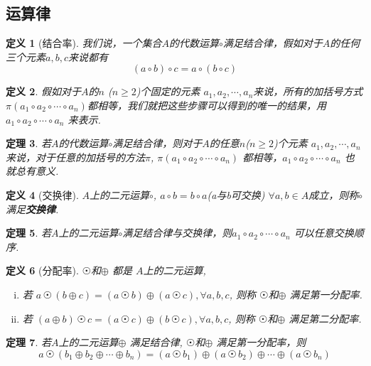 \documentclass[UTF8]{ctexart}
\newtheorem{Definition}{定义}%
\newtheorem{Theorem}[Definition]{定理}
\begin{document}
\subsection{运算律}

\begin{Definition}[结合率]
我们说，一个集合$A$的代数运算$\circ$满足结合律，假如对于$A$的任何三个元素$a, b, c$来说都有$$
(a \circ b) \circ c = a \circ (b \circ c)
$$
\end{Definition}

\begin{Definition}
假如对于$A$的$n$ ($n \ge 2$)个固定的元素 $a_1, a_2, \cdots, a_n$来说，所有的加括号方式 $\pi(a_1 \circ a_2 \circ \cdots \circ a_n)$都相等，我们就把这些步骤可以得到的唯一的结果，用$a_1 \circ a_2 \circ \cdots \circ a_n $ 来表示.
\end{Definition}

\begin{Theorem}
若$A$的代数运算$\circ$满足结合律，则对于$A$的任意$n$($n \ge 2$)个元素 $a_1, a_2, \cdots, a_n$来说，对于任意的加括号的方法$\pi$, $\pi(a_1 \circ a_2 \circ \cdots \circ a_n)$ 都相等，$a_1 \circ a_2 \circ \cdots \circ a_n$ 也就总有意义.
\end{Theorem}

\begin{Definition}[交换律]
$A$上的二元运算$\circ$, $a \circ b = b \circ a$\;(a与b可交换) $\forall a, b \in A$成立，则称$\circ$满足\textbf{交换律}. 
\end{Definition}

\begin{Theorem}
若$A$上的二元运算$\circ$满足结合律与交换律，则$a_1 \circ a_2 \circ \cdots \circ a_n$ 可以任意交换顺序.
\end{Theorem}

\begin{Definition}[分配率]
$ \astrosun $和$ \oplus $ 都是 $A$上的二元运算, 
\begin{enumerate}[i)]
\item 若
$ a \, \astrosun \, (b \oplus c) = (a \, \astrosun \, b) \oplus (a \, \astrosun \, c), \forall a, b, c $, 则称 $ \astrosun$和$ \oplus $  满足第一分配率.
\item 若
$ (a \oplus b) \, \astrosun \, c = (a \, \astrosun \, c) \oplus ( b \, \astrosun \, c), \forall a, b, c$, 则称 $ \astrosun$和$\oplus $  满足第二分配率.
\end{enumerate}
\end{Definition}


\begin{Theorem}
若$A$上的二元运算$\oplus$ 满足结合律, $ \astrosun $和$\oplus $ 满足第一分配率，则
$$
a \, \astrosun \, ( b_1 \oplus b_2 \oplus \cdots \oplus b_n ) =  ( a \, \astrosun \, b_1) \oplus (a \, \astrosun \, b_2) \oplus \cdots \oplus (a \, \astrosun \, b_n)
$$
\end{Theorem}
\end{document}
